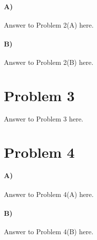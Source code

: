 \documentclass[10pt,letter]{article}
\begin{document}
\paragraph{A)} Answer to Problem 2(A) here.

\paragraph{B)} Answer to Problem 2(B) here.


\section*{Problem 3} Answer to Problem 3 here.


\section*{Problem 4}

\paragraph{A)} Answer to Problem 4(A) here.

\paragraph{B)}  Answer to Problem 4(B) here.
\end{document}
